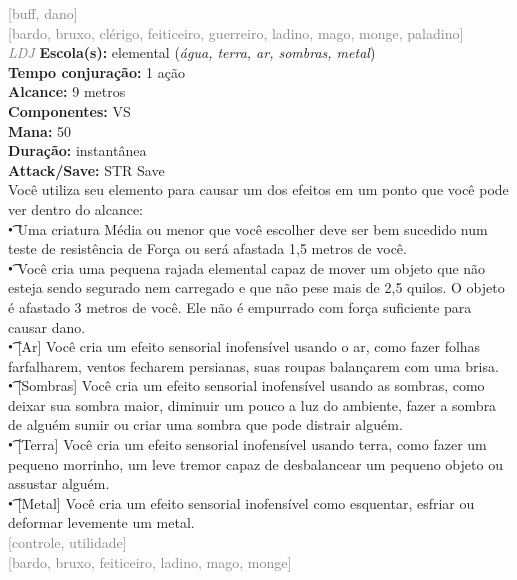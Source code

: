 \documentclass{RPG_Adventure}[2021/10/20]
\begin{document}
{\scriptsize \textcolor{gray}{[buff, dano]\\}}
{\scriptsize \textcolor{gray}{[bardo, bruxo, clérigo, feiticeiro, guerreiro, ladino, mago, monge, paladino]\\}}
{\tiny \textcolor{gray}{\textit{LDJ}}}
{\small \t \textbf{Escola(s):} elemental (\textit{água, terra, ar, sombras, metal})\\\t \textbf{Tempo conjuração:} 1 ação\\\t \textbf{Alcance:} 9 metros\\\t \textbf{Componentes:} VS\\\t \textbf{Mana:} 50\\\t \textbf{Duração:} instantânea\\\t \textbf{Attack/Save:} STR Save\\}
{\normalsize Você utiliza seu elemento para causar um dos efeitos em um ponto que você pode ver dentro do alcance:\\\t • Uma criatura Média ou menor que você escolher deve ser bem sucedido num teste de resistência de Força ou será afastada 1,5 metros de você.\\\t • Você cria uma pequena rajada elemental capaz de mover um objeto que não esteja sendo segurado nem carregado e que não pese mais de 2,5 quilos. O objeto é afastado 3 metros de você. Ele não é empurrado com força suficiente para causar dano.\\\t • [Ar] Você cria um efeito sensorial inofensível usando o ar, como fazer folhas farfalharem, ventos fecharem persianas, suas roupas balançarem com uma brisa.\\\t • [Sombras] Você cria um efeito sensorial inofensível usando as sombras, como deixar sua sombra maior, diminuir um pouco a luz do ambiente, fazer a sombra de alguém sumir ou criar uma sombra que pode distrair alguém.\\\t • [Terra] Você cria um efeito sensorial inofensível usando terra, como fazer um pequeno morrinho, um leve tremor capaz de desbalancear um pequeno objeto ou assustar alguém.\\\t • [Metal] Você cria um efeito sensorial inofensível como esquentar, esfriar ou deformar levemente um metal.\\}
{\scriptsize \textcolor{gray}{[controle, utilidade]\\}}
{\scriptsize \textcolor{gray}{[bardo, bruxo, feiticeiro, ladino, mago, monge]\\}}
\end{document}
